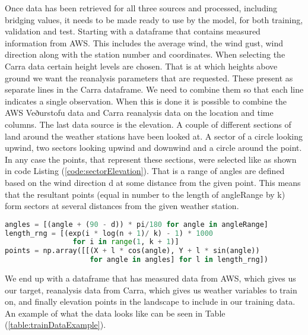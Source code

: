 Once data has been retrieved for all three sources and processed, including bridging values, it needs to be made ready to use by the model, for both training, validation and test. Starting with a dataframe that contains measured information from AWS. This includes the average wind, the wind gust, wind direction along with the station number and coordinates. When selecting the Carra data certain height levels are chosen. That is at which heights above ground we want the reanalysis parameters that are requested. These present as separate lines in the Carra dataframe. We need to combine them so that each line indicates a single observation. When this is done it is possible to combine the AWS Veðurstofu data and Carra reanalysis data on the location and time columns. The last data source is the elevation. A couple of different sections of land around the weather stations have been looked at. A sector of a circle looking upwind, two sectors looking upwind and downwind and a circle around the point. In any case the points, that represent these sections, were selected like as shown in code Listing (\ref{code:sectorElevation}). That is a range of angles are defined based on the wind direction d at some distance from the given point. This means that the resultant points (equal in number to the length of angleRange by k) form sectors at several distances from the given weather station.

\begin{lstlisting}[language = Python, caption = {Sector elevation points generated}, label = code:sectorElevation]
angles = [(angle + (90 - d)) * pi/180 for angle in angleRange]
length_rng = [(exp(i * log(n + 1)/ k) - 1) * 1000 
                for i in range(1, k + 1)]
points = np.array([[(X + l * cos(angle), Y + l * sin(angle))
                    for angle in angles] for l in length_rng])   
\end{lstlisting}

We end up with a dataframe that has measured data from AWS, which gives us our target, reanalysis data from Carra, which gives us weather variables to train on, and finally elevation points in the landscape to include in our training data. An example of what the data looks like can be seen in Table (\ref{table:trainDataExample}).

\begin{table}[h]
    \caption{An example of data structure used with model}
    \label{table:trainDataExample}
\end{table}

